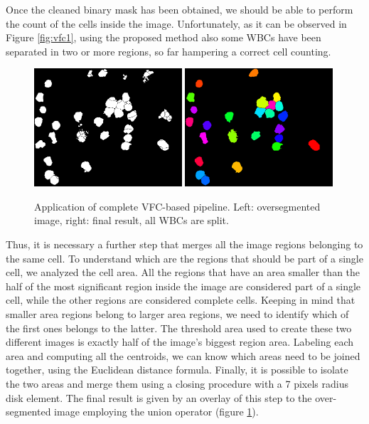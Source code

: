\documentclass[final,a4paper,12pt,english]{UnicaPhdThesis3}
\begin{document}
{Once the cleaned binary mask has been obtained, we should be able to perform the count of the cells inside the image. Unfortunately, as it can be observed in Figure \ref{fig:vfc1}, using the proposed method also some WBCs have been separated in two or more regions, so far hampering a correct cell counting.

\begin{figure}[!b]
	\centering
	\includegraphics[width=0.49\textwidth]{images/2018_1_visapp/figure8.png}
	\includegraphics[width=0.49\textwidth]{images/2018_1_visapp/detection.png}
	\caption{\label{fig:vfc2}Application of complete VFC-based pipeline. Left: oversegmented image, right: final result, all WBCs are split.}
\end{figure}
Thus, it is necessary a further step that merges all the image regions belonging to the same cell. To understand which are the regions that should be part of a single cell, we analyzed the cell area.
All the regions that have an area smaller than the half of the most significant region inside the image are considered part of a single cell, while the other regions are considered complete cells.
Keeping in mind that smaller area regions belong to larger area regions, we need to identify which of the first ones belongs to the latter. The threshold area used to create these two different images is exactly half of the image's biggest region area. Labeling each area and computing all the centroids, we can know which areas need to be joined together, using the Euclidean distance formula. Finally, it is possible to isolate the two areas and merge them using a closing procedure with a 7 pixels radius disk element. The final result is given by an overlay of this step to the over-segmented image employing the union operator (figure \ref{fig:vfc2}).

}
\end{document}
